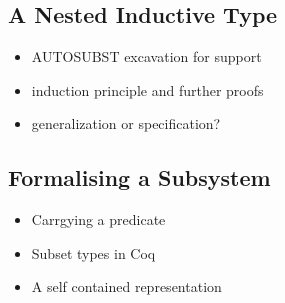 \subsection{A Nested Inductive Type}
\begin{itemize}
\item AUTOSUBST excavation for support
\item induction principle and further proofs
\item generalization or specification?
\end{itemize}

\subsection{Formalising a Subsystem}

\begin{itemize}
\item Carrgying a predicate
\item Subset types in Coq
\item A self contained representation
\end{itemize}

